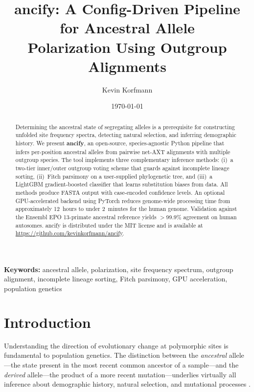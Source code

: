 \documentclass[11pt,a4paper]{article}
\title{\textbf{ancify: A Config-Driven Pipeline for Ancestral Allele\\
Polarization Using Outgroup Alignments}}
\author[1]{Kevin Korfmann}
\affil[1]{Independent Researcher}
\date{\today}
\begin{document}
\maketitle

\begin{abstract}
Determining the ancestral state of segregating alleles is a prerequisite for
constructing unfolded site frequency spectra, detecting natural selection, and
inferring demographic history. We present \textbf{ancify}, an open-source,
species-agnostic Python pipeline that infers per-position ancestral alleles
from pairwise net-AXT alignments with multiple outgroup species. The tool
implements three complementary inference methods: (i)~a two-tier inner/outer
outgroup voting scheme that guards against incomplete lineage sorting,
(ii)~Fitch parsimony on a user-supplied phylogenetic tree, and (iii)~a
LightGBM gradient-boosted classifier that learns substitution biases from
data. All methods produce FASTA output with case-encoded confidence levels.
An optional GPU-accelerated backend using PyTorch reduces genome-wide
processing time from approximately 12~hours to under 2~minutes for the
human genome. Validation against the Ensembl EPO 13-primate ancestral
reference yields $>$99.9\% agreement on human autosomes. ancify is
distributed under the MIT license and is available at
\url{https://github.com/kevinkorfmann/ancify}.
\end{abstract}

\vspace{0.5em}
\noindent\textbf{Keywords:}
ancestral allele, polarization, site frequency spectrum, outgroup alignment,
incomplete lineage sorting, Fitch parsimony, GPU acceleration, population genetics

\section{Introduction}
\label{sec:introduction}

Understanding the direction of evolutionary change at polymorphic sites is
fundamental to population genetics. The distinction between the \emph{ancestral}
allele---the state present in the most recent common ancestor of a sample---and
the \emph{derived} allele---the product of a more recent mutation---underlies
virtually all inference about demographic history, natural selection, and
mutational processes \citep{Kimura1983,Watterson1975}.
\end{document}
